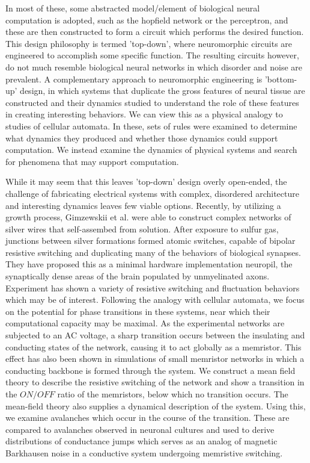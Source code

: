 \documentclass[aps,prl,preprint,groupedaddress]{revtex4-1}
\begin{document}
In most of these, some abstracted model/element of
biological neural computation is adopted, such as the hopfield network or the
perceptron, and these are then constructed to form a circuit which
performs the desired function.  This design philosophy is termed 'top-down',
where neuromorphic circuits are engineered to accomplish some specific 
function.  The resulting circuits however, do not
much resemble biological neural networks in which disorder and noise are
prevalent.  A complementary approach to neuromorphic engineering is 'bottom-up'
design, in which systems that duplicate the gross features of neural tissue
are constructed and their dynamics studied to understand the role of these
features in creating interesting behaviors.  We can view this as a physical
analogy to studies of cellular automata. In these, sets of rules were examined
to determine what dynamics they produced and whether those dynamics could
support computation.\cite{Langton1990}  We instead examine the dynamics of
physical systems and search for phenomena that may support computation.

While it may seem that this leaves 'top-down' design overly open-ended, the
challenge of fabricating electrical systems with complex, disordered
architecture and interesting dynamics leaves few viable options.  Recently, by
utilizing a growth process, Gimzewskii et al. were able to construct
complex networks
of silver wires that self-assembed from  solution.  After exposure to sulfur
gas, junctions
between silver formations formed atomic switches, capable of bipolar resistive
switching and duplicating many of the behaviors of biological synapses.  They
have proposed this as a minimal hardware implementation neuropil, the
synaptically dense areas of the brain populated by unmyelinated axons.
Experiment has shown a variety of resistive switching and fluctuation
behaviors which may be of interest.  Following the analogy with cellular
automata, we focus on the potential for phase transitions in these systems,
near which their computational capacity may be maximal.  As the experimental
networks are subjected to an AC voltage, a sharp transition occurs between
the insulating and conducting states of the network, causing it to act
globally as a memristor.  This effect has also been shown in simulations of
small memristor networks in which a conducting backbone is formed through
the system.  We construct a mean field theory to describe the resistive
switching of the network and show a transition in the $ON/OFF$ ratio of
the memristors, below which no transition occurs.  The mean-field theory
also supplies a dynamical description of the system.  Using this, we examine
avalanches which occur in the course of the transition.  These are compared
to avalanches observed in neuronal cultures and used to derive distributions
of conductance jumps which serves as an analog of magnetic Barkhausen noise
in a conductive system undergoing memristive switching.
\end{document}
